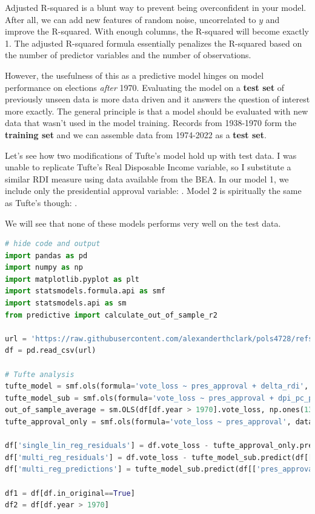 Adjusted R-squared is a blunt way to prevent being overconfident in your model. After all, we can add new features of random noise, uncorrelated to $y$ and improve the R-squared. With enough columns, the R-squared will become exactly 1. The adjusted R-squared formula essentially penalizes the R-squared based on the number of predictor variables and the number of observations.

However, the usefulness of this as a predictive model hinges on model performance on elections \textit{after} 1970. Evaluating the model on a \textbf{test set} of previously unseen data is more data driven and it answers the question of interest more exactly. The general principle is that a model should be evaluated with new data that wasn't used in the model training. Records from 1938-1970 form the \textbf{training set} and we can assemble data from 1974-2022 as a \textbf{test set}.

Let's see how two modifications of Tufte's model hold up with test data. I was unable to replicate Tufte's Real Disposable Income variable, so I substitute a similar RDI measure using data available from the BEA. In our model 1, we include only the presidential approval variable: . Model 2 is spiritually the same as Tufte's though: .

We will see that none of these models performs very well on the test data.

\begin{lstlisting}[language=Python]
# hide code and output
import pandas as pd
import numpy as np
import matplotlib.pyplot as plt
import statsmodels.formula.api as smf
import statsmodels.api as sm
from predictive import calculate_out_of_sample_r2

url = 'https://raw.githubusercontent.com/alexanderthclark/pols4728/refs/heads/main/data/tufte_midterms.csv'
df = pd.read_csv(url)

# Tufte analysis
tufte_model = smf.ols(formula='vote_loss ~ pres_approval + delta_rdi', data=df[df.in_original==True]).fit()
tufte_model_sub = smf.ols(formula='vote_loss ~ pres_approval + dpi_pc_pct_yoy', data=df[df.in_original==True]).fit()
out_of_sample_average = sm.OLS(df[df.year > 1970].vote_loss, np.ones(13)).fit()
tufte_approval_only = smf.ols(formula='vote_loss ~ pres_approval', data=df[df.in_original==True]).fit()

df['single_lin_reg_residuals'] = df.vote_loss - tufte_approval_only.predict(df.pres_approval)
df['multi_reg_residuals'] = df.vote_loss - tufte_model_sub.predict(df[['pres_approval', 'dpi_pc_pct_yoy']])
df['multi_reg_predictions'] = tufte_model_sub.predict(df[['pres_approval', 'dpi_pc_pct_yoy']])

df1 = df[df.in_original==True]
df2 = df[df.year > 1970]
\end{lstlisting}

